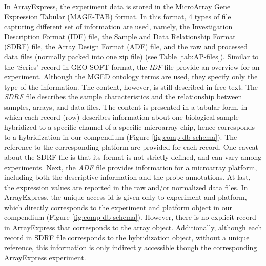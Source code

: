%
In ArrayExpress, the experiment data is stored in the MicroArray Gene
Expression Tabular (MAGE-TAB) format.
%
In this format, 4 types of file capturing different set of information are
used, namely, the Investigation Description Format (IDF) file, the Sample and
Data Relationship Format (SDRF) file, the Array Design Format (ADF) file, and
the raw and processed data files (normally packed into one zip file) (see Table
\ref{tab:AP-files}).
%
Similar to the `Series' record in GEO SOFT format, the \textit{IDF} file
provide an overview for an experiment.
%
Although the MGED ontology terms are used, they specify only the type of the
information.  The content, however, is still described in free text.
%
The \textit{SDRF} file describes the sample characteristics and the
relationship between samples, arrays, and data files.
%
The content is presented in a tabular form, in which each record (row)
describes information about one biological sample hybridized to a specific
channel of a specific microarray chip, hence corresponds to a hybridization in
our compendium (Figure \ref{fig:comp-db-schema}).
%
The reference to the corresponding platform are provided for each record.
%
One caveat about the SDRF file is that its format is not strictly defined, and
can vary among experiments.
%
Next, the \textit{ADF} file provides information for a microarray platform,
including both the descriptive information and the probe annotations.
%
At last, the expression values are reported in the raw and/or normalized
data files.
%
In ArrayExpress, the unique access id is given only to experiment and
platform, which directly corresponds to the experiment and platform object
in our compendium (Figure \ref{fig:comp-db-schema}).
%
However, there is no explicit record in ArrayExpress that corresponds to the
array object.  Additionally, although each record in SDRF file corresponds to
the hybridization object, without a unique reference, this information is only
indirectly accessible though the corresponding ArrayExpress experiment.
%

